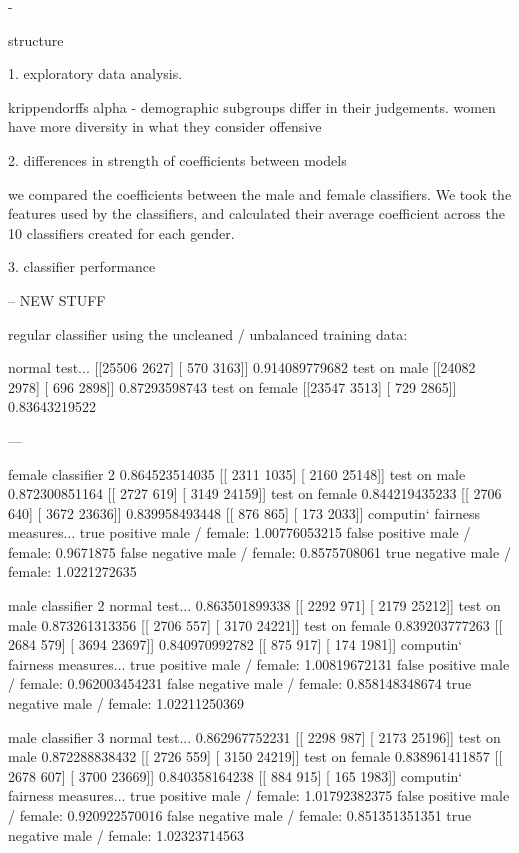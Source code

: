 \documentclass[sigconf]{acmart}
\begin{document}
-

structure

1. exploratory data analysis.

krippendorffs alpha - demographic subgroups differ in their judgements.
women have more diversity in what they consider offensive

2. differences in strength of coefficients between models

we compared the coefficients between the male and female classifiers. We took the features used by the classifiers, and calculated their average coefficient across the 10 classifiers created for each gender. 

3. classifier performance

-- NEW STUFF

regular classifier using the uncleaned / unbalanced training data:

normal test...
[[25506  2627]
 [  570  3163]]
 0.914089779682
test on male
[[24082  2978]
 [  696  2898]]
0.87293598743
test on female
[[23547  3513]
 [  729  2865]]
0.83643219522

---

female classifier 2
0.864523514035
[[ 2311  1035]
 [ 2160 25148]]
test on male
0.872300851164
[[ 2727   619]
 [ 3149 24159]]
test on female
0.844219435233
[[ 2706   640]
 [ 3672 23636]]
0.839958493448
[[ 876  865]
 [ 173 2033]]
computin` fairness measures...
true positive male / female: 1.00776053215
false positive male / female: 0.9671875 
false negative male / female: 0.8575708061 
true negative male / female: 1.0221272635

male classifier 2
normal test...
0.863501899338
[[ 2292   971]
 [ 2179 25212]]
test on male
0.873261313356
[[ 2706   557]
 [ 3170 24221]]
test on female
0.839203777263
[[ 2684   579]
 [ 3694 23697]]
0.840970992782
[[ 875  917]
 [ 174 1981]]
computin` fairness measures...
true positive male / female: 1.00819672131
false positive male / female: 0.962003454231 
false negative male / female: 0.858148348674 
true negative male / female: 1.02211250369


male classifier 3
normal test...
0.862967752231
[[ 2298   987]
 [ 2173 25196]]
test on male
0.872288838432
[[ 2726   559]
 [ 3150 24219]]
test on female
0.838961411857
[[ 2678   607]
 [ 3700 23669]]
0.840358164238
[[ 884  915]
 [ 165 1983]]
computin` fairness measures...
true positive male / female: 1.01792382375
false positive male / female: 0.920922570016 
false negative male / female: 0.851351351351 
true negative male / female: 1.02323714563
\end{document}
